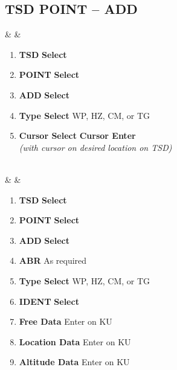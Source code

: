 \documentclass[fontHelvetica]{TechCheck}
\begin{document}
	\subsection{TSD POINT -- ADD}
	\begin{listlongtable}
			\textbf{\textbullet} &  &
			\begin{minipage}[t]{\linewidth}
				\vspace{-7pt}
				\begin{enumerate}
					\item \textbf{TSD} \dotfill \textbf{Select}
					\item \textbf{POINT} \dotfill \textbf{Select}
					\item \textbf{ADD} \dotfill \textbf{Select}
					\item \textbf{Type Select} \dotfill WP, HZ, CM, or TG 
					\item \textbf{Cursor Select} \dotfill \textbf{Cursor Enter} \\
					\hfill \emph{(with cursor on desired location on TSD)}
				\end{enumerate}
			\end{minipage} \\
			\midrule
			\textbf{\textbullet} &  &
			\begin{minipage}[t]{\linewidth}
				\vspace{-7pt}
				\begin{enumerate}
					\item \textbf{TSD} \dotfill \textbf{Select}
					\item \textbf{POINT} \dotfill \textbf{Select}
					\item \textbf{ADD} \dotfill \textbf{Select}
					\item \textbf{ABR} \dotfill As required
					\item \textbf{Type Select} \dotfill WP, HZ, CM, or TG 
					\item \textbf{IDENT} \dotfill \textbf{Select}
					\item \textbf{Free Data} \dotfill Enter on KU
					\item \textbf{Location Data} \dotfill Enter on KU
					\item \textbf{Altitude Data} \dotfill Enter on KU
				\end{enumerate}
			\end{minipage} \\
			\end{listlongtable}

	\clearpage
\end{document}
